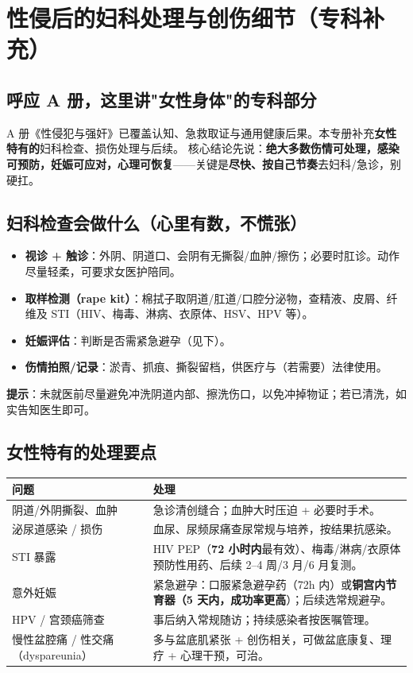 \chapter{性侵后的妇科处理与创伤细节（专科补充）}

\section{呼应 A 册，这里讲"女性身体"的专科部分}
A 册《性侵犯与强奸》已覆盖认知、急救取证与通用健康后果。本专册补充\textbf{女性特有的}妇科检查、损伤处理与后续。
核心结论先说：\textbf{绝大多数伤情可处理，感染可预防，妊娠可应对，心理可恢复}——关键是\textbf{尽快、按自己节奏}去妇科/急诊，别硬扛。

\section{妇科检查会做什么（心里有数，不慌张）}
\begin{itemize}
  \item \textbf{视诊 + 触诊}：外阴、阴道口、会阴有无撕裂/血肿/擦伤；必要时肛诊。动作尽量轻柔，可要求女医护陪同。
  \item \textbf{取样检测（rape kit）}：棉拭子取阴道/肛道/口腔分泌物，查精液、皮屑、纤维及 STI（HIV、梅毒、淋病、衣原体、HSV、HPV 等）。
  \item \textbf{妊娠评估}：判断是否需紧急避孕（见下）。
  \item \textbf{伤情拍照/记录}：淤青、抓痕、撕裂留档，供医疗与（若需要）法律使用。
\end{itemize}
\textbf{提示}：未就医前尽量避免冲洗阴道内部、擦洗伤口，以免冲掉物证；若已清洗，如实告知医生即可。

\section{女性特有的处理要点}
\begin{tabularx}{\textwidth}{l X}
\toprule
\textbf{问题} & \textbf{处理} \\
\midrule
阴道/外阴撕裂、血肿 & 急诊清创缝合；血肿大时压迫 + 必要时手术。 \\
泌尿道感染 / 损伤 & 血尿、尿频尿痛查尿常规与培养，按结果抗感染。 \\
STI 暴露 & HIV PEP（\textbf{72 小时内}最有效）、梅毒/淋病/衣原体预防性用药、后续 2--4 周/3 月/6 月复测。 \\
意外妊娠 & 紧急避孕：口服紧急避孕药（72h 内）或\textbf{铜宫内节育器（5 天内，成功率更高}）；后续选常规避孕。 \\
HPV / 宫颈癌筛查 & 事后纳入常规随访；持续感染者按医嘱管理。 \\
慢性盆腔痛 / 性交痛（dyspareunia） & 多与盆底肌紧张 + 创伤相关，可做盆底康复、理疗 + 心理干预，可治。 \\
\bottomrule
\end{tabularx}

